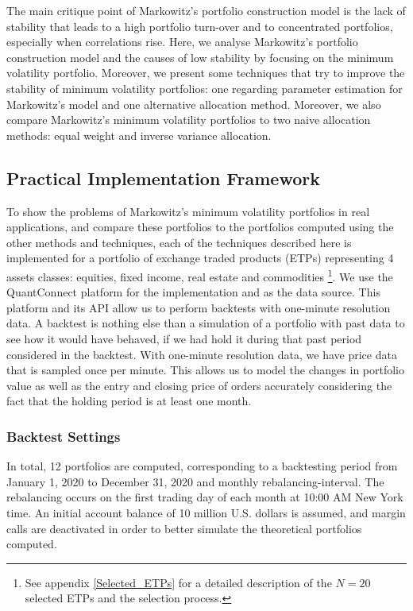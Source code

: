 The main critique point of Markowitz's portfolio construction model is the lack of stability that leads to a high portfolio turn-over and to concentrated portfolios, especially when correlations rise. Here, we analyse Markowitz's portfolio construction model and the causes of low stability by focusing on the minimum volatility portfolio. Moreover, we present some techniques that try to improve the stability of minimum volatility portfolios: one regarding parameter estimation for Markowitz's model and one alternative allocation method. Moreover, we also compare Markowitz's minimum volatility portfolios to two naive allocation methods: equal weight and inverse variance allocation.

\subsection{Practical Implementation Framework}
    
    To show the problems of Markowitz's minimum volatility portfolios in real applications, and compare these portfolios to the portfolios computed using the other methods and techniques, each of the techniques described here is implemented for a portfolio of exchange traded products (ETPs) representing 4 assets classes: equities, fixed income, real estate and commodities \footnote{See appendix \ref{Selected_ETPs} for a detailed description of the $N=20$ selected ETPs and the selection process.}. We use the QuantConnect platform \cite{qcwebsite} for the implementation and as the data source. This platform and its API allow us to perform backtests with one-minute resolution data. A backtest is nothing else than a simulation of a portfolio with past data to see how it would have behaved, if we had hold it during that past period considered in the backtest. With one-minute resolution data, we have price data that is sampled once per minute. This allows us to model the changes in portfolio value as well as the entry and closing price of orders accurately considering the fact that the holding period is at least one month.
    
    \subsubsection{Backtest Settings}\label{backtestsettingssec}
        In total, 12 portfolios are computed, corresponding to a backtesting period from January 1, 2020 to December 31, 2020 and monthly rebalancing-interval. The rebalancing occurs on the first trading day of each month at 10:00 AM New York time. An initial account balance of 10 million U.S. dollars is assumed, and margin calls are deactivated in order to better simulate the theoretical portfolios computed.
        
